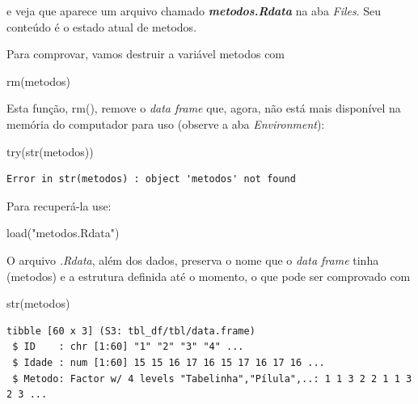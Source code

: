 \documentclass[
]{article}
\newenvironment{Shaded}{\begin{snugshade}}{\end{snugshade}}
\newcommand{\FunctionTok}[1]{\textcolor[rgb]{0.00,0.00,0.00}{#1}}
\newcommand{\NormalTok}[1]{#1}
\newcommand{\StringTok}[1]{\textcolor[rgb]{0.31,0.60,0.02}{#1}}
\begin{document}
e veja que aparece um arquivo chamado \emph{\textbf{metodos.Rdata}} na
aba \emph{Files}. Seu conteúdo é o estado atual de metodos.

Para comprovar, vamos destruir a variável metodos com

\begin{Shaded}
\begin{Highlighting}[]
\FunctionTok{rm}\NormalTok{(metodos)}
\end{Highlighting}
\end{Shaded}

Esta função, rm(), remove o \emph{data frame} que, agora, não está mais
disponível na memória do computador para uso (observe a aba
\emph{Environment}):

\begin{Shaded}
\begin{Highlighting}[]
\FunctionTok{try}\NormalTok{(}\FunctionTok{str}\NormalTok{(metodos))}
\end{Highlighting}
\end{Shaded}

\begin{verbatim}
Error in str(metodos) : object 'metodos' not found
\end{verbatim}

Para recuperá-la use:

\begin{Shaded}
\begin{Highlighting}[]
\FunctionTok{load}\NormalTok{(}\StringTok{"metodos.Rdata"}\NormalTok{)}
\end{Highlighting}
\end{Shaded}

O arquivo \emph{.Rdata}, além dos dados, preserva o nome que o
\emph{data frame} tinha (metodos) e a estrutura definida até o momento,
o que pode ser comprovado com

\begin{Shaded}
\begin{Highlighting}[]
\FunctionTok{str}\NormalTok{(metodos)}
\end{Highlighting}
\end{Shaded}

\begin{verbatim}
tibble [60 x 3] (S3: tbl_df/tbl/data.frame)
 $ ID    : chr [1:60] "1" "2" "3" "4" ...
 $ Idade : num [1:60] 15 15 16 17 16 15 17 16 17 16 ...
 $ Metodo: Factor w/ 4 levels "Tabelinha","Pílula",..: 1 1 3 2 2 1 1 3 2 3 ...
\end{verbatim}
\end{document}

